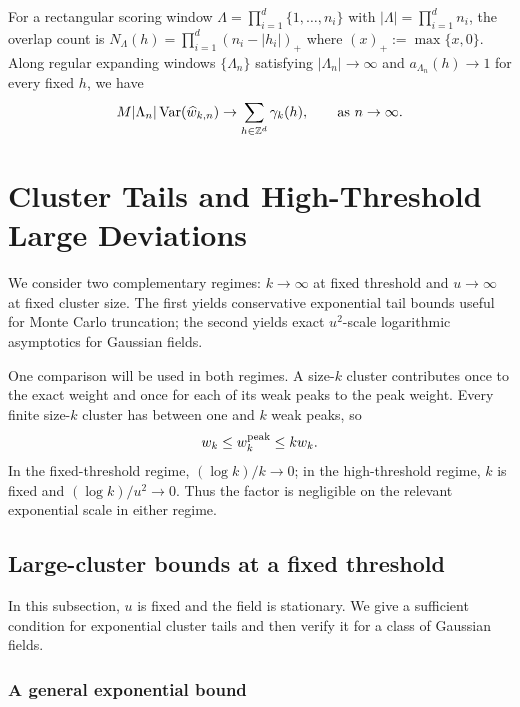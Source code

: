 \documentclass[aap,preprint]{imsart}
\theoremstyle{plain}
\theoremstyle{definition}
\def\Z{{\mathbb Z}}
\begin{document}
For a rectangular scoring window $\Lambda=\prod_{i=1}^d\{1,\ldots,n_i\}$ with $|\Lambda|=\prod_{i=1}^dn_i$, the overlap count is $N_\Lambda(h)=\prod_{i=1}^d(n_i-|h_i|)_+$ where $(x)_+:=\max\{x,0\}$.
Along regular expanding windows $\{\Lambda_n\}$ satisfying
$|\Lambda_n|\to\infty$ and $a_{\Lambda_n}(h)\to 1$ for every fixed $h$,
we have
\begin{equation*}
	M|\Lambda_n|\operatorname{Var}(\widehat w_{k,n})
	\to \sum_{h\in\Z^d}\gamma_k(h),
	\qquad \text{\rm as } n\to\infty.
\end{equation*}

\section{Cluster Tails and High-Threshold Large Deviations}
\label{sec:large-deviations}

We consider two complementary regimes: $k\to\infty$ at fixed threshold and
$u\to\infty$ at fixed cluster size.  The first yields conservative
exponential tail bounds useful for Monte Carlo truncation; the second yields
exact $u^2$-scale logarithmic asymptotics for Gaussian fields.

One comparison will be used in both regimes.  A size-$k$ cluster contributes once to the exact weight and once for each of its weak peaks to the peak weight.
Every finite size-$k$ cluster has between one and $k$ weak peaks, so
\begin{equation}\label{eq:ld-weight-sandwich}
	w_k\leq w_k^{\rm peak}\leq k w_k.
\end{equation}
In the fixed-threshold regime, $(\log k)/k\to0$; in the high-threshold
regime, $k$ is fixed and $(\log k)/u^2\to0$.  Thus the factor is negligible
on the relevant exponential scale in either regime.  

\subsection{Large-cluster bounds at a fixed threshold}
\label{sec:ld-large-k}

In this subsection, $u$ is fixed and the field is stationary.  We give a
sufficient condition for exponential cluster tails and then verify it for a
class of Gaussian fields.

\subsubsection{A general exponential bound}
\label{sec:ld-general-bound}
\end{document}
